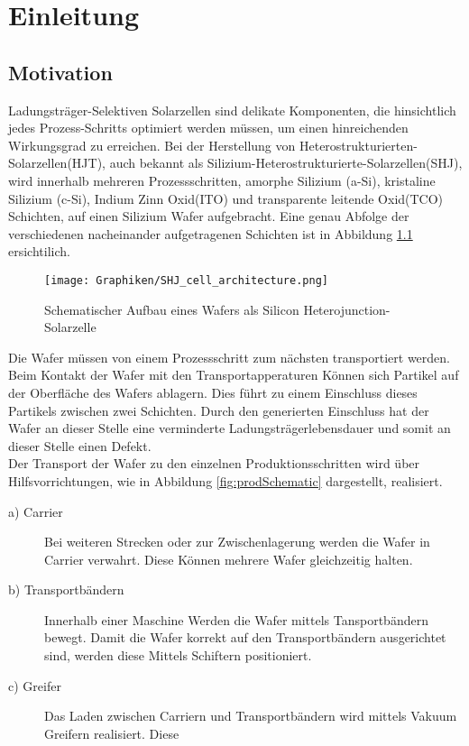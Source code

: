 \chapter{Einleitung}
\label{chap:einleitung}
\section{Motivation}


Ladungsträger-Selektiven Solarzellen sind delikate Komponenten, die hinsichtlich jedes Prozess-Schritts optimiert werden müssen, um einen hinreichenden Wirkungsgrad zu erreichen. Bei der Herstellung von Heterostrukturierten-Solarzellen(HJT), auch bekannt als Silizium-Heterostrukturierte-Solarzellen(SHJ), wird innerhalb mehreren Prozessschritten, amorphe Silizium (a-Si), kristaline Silizium (c-Si), Indium Zinn Oxid(ITO) und transparente leitende Oxid(TCO) Schichten, auf einen Silizium Wafer aufgebracht. Eine genau Abfolge der verschiedenen nacheinander aufgetragenen Schichten ist in Abbildung \ref{fig:cell_arch} ersichtilich.

   \begin{figure}[h!]
    \centering
    \texttt{[image: Graphiken/SHJ\_cell\_architecture.png]}
    \caption{Schematischer Aufbau eines Wafers als Silicon Heterojunction-Solarzelle}
    \label{fig:cell_arch}
\end{figure}
Die Wafer müssen von einem Prozessschritt zum nächsten transportiert werden. Beim Kontakt der Wafer mit den Transportapperaturen Können sich Partikel auf der Oberfläche des Wafers ablagern. Dies führt zu einem Einschluss dieses Partikels zwischen zwei Schichten. Durch den generierten Einschluss hat der Wafer an dieser Stelle eine verminderte Ladungsträgerlebensdauer und somit an dieser Stelle einen Defekt.   \\
Der Transport der Wafer zu den einzelnen Produktionsschritten wird über Hilfsvorrichtungen, wie in Abbildung \ref{fig:prodSchematic} dargestellt, realisiert. 

\begin{description}
    \item [a) Carrier] Bei weiteren Strecken oder zur Zwischenlagerung werden die Wafer in Carrier verwahrt. Diese Können mehrere Wafer gleichzeitig halten.   
    \item [b) Transportbändern] Innerhalb einer Maschine Werden die Wafer mittels Tansportbändern bewegt. Damit die Wafer korrekt auf den Transportbändern ausgerichtet sind, werden diese Mittels Schiftern positioniert.
    \item [c) Greifer] Das Laden zwischen Carriern und Transportbändern wird mittels Vakuum Greifern realisiert. Diese 
\end{description}


